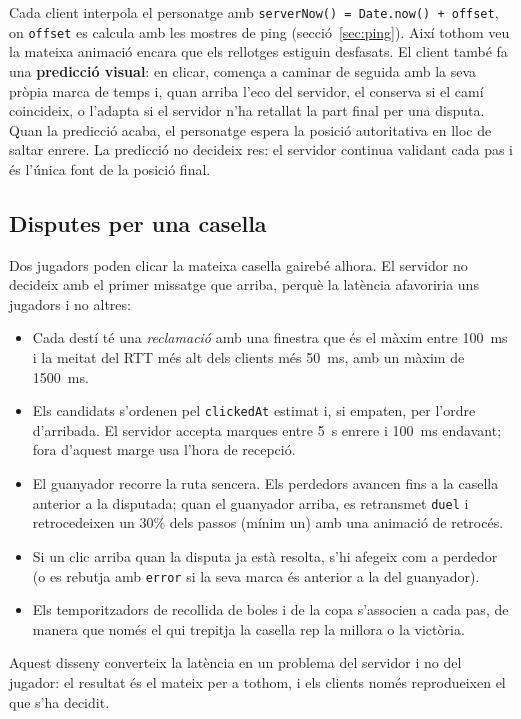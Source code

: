 \documentclass[11pt,a4paper]{article}
\begin{document}
Cada client interpola el personatge amb
\texttt{serverNow() = Date.now() + offset}, on \texttt{offset} es calcula amb les
mostres de ping (secció~\ref{sec:ping}). Així tothom veu la mateixa animació encara que
els rellotges estiguin desfasats. El client també fa una \textbf{predicció visual}: en
clicar, comença a caminar de seguida amb la seva pròpia marca de temps i, quan arriba
l'eco del servidor, el conserva si el camí coincideix, o l'adapta si el servidor n'ha
retallat la part final per una disputa. Quan la predicció acaba, el personatge espera
la posició autoritativa en lloc de saltar enrere. La predicció no decideix res: el
servidor continua validant cada pas i és l'única font de la posició final.

\subsection{Disputes per una casella}

Dos jugadors poden clicar la mateixa casella gairebé alhora. El servidor no decideix
amb el primer missatge que arriba, perquè la latència afavoriria uns jugadors i no
altres:

\begin{itemize}
  \item Cada destí té una \emph{reclamació} amb una finestra que és el màxim entre
        100~ms i la meitat del RTT més alt dels clients més 50~ms, amb un màxim de
        1500~ms.
  \item Els candidats s'ordenen pel \texttt{clickedAt} estimat i, si empaten, per
        l'ordre d'arribada. El servidor accepta marques entre 5~s enrere i 100~ms
        endavant; fora d'aquest marge usa l'hora de recepció.
  \item El guanyador recorre la ruta sencera. Els perdedors avancen fins a la casella
        anterior a la disputada; quan el guanyador arriba, es retransmet \texttt{duel}
        i retrocedeixen un 30\% dels passos (mínim un) amb una animació de retrocés.
  \item Si un clic arriba quan la disputa ja està resolta, s'hi afegeix com a perdedor
        (o es rebutja amb \texttt{error} si la seva marca és anterior a la del
        guanyador).
  \item Els temporitzadors de recollida de boles i de la copa s'associen a cada pas, de
        manera que només el qui trepitja la casella rep la millora o la victòria.
\end{itemize}

Aquest disseny converteix la latència en un problema del servidor i no del jugador: el
resultat és el mateix per a tothom, i els clients només reprodueixen el que s'ha decidit.
\end{document}
